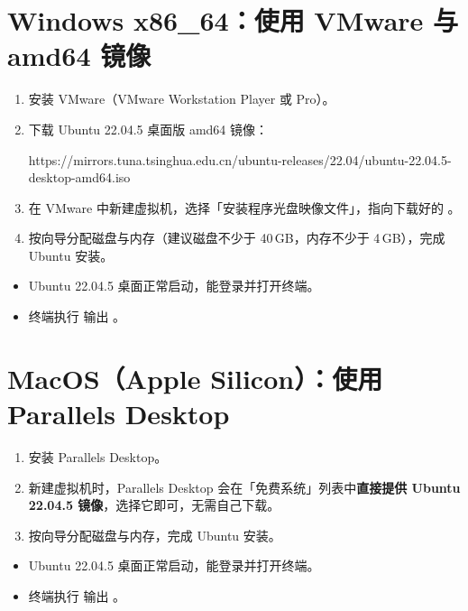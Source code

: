\section{Windows x86\_64：使用 VMware 与 amd64 镜像}
\label{sec:win-vmware}
\begin{enumerate}
\item 安装 VMware（VMware Workstation Player 或 Pro）。
\item 下载 Ubuntu 22.04.5 桌面版 amd64 镜像：
\begin{command}
https://mirrors.tuna.tsinghua.edu.cn/ubuntu-releases/22.04/ubuntu-22.04.5-desktop-amd64.iso
\end{command}
\item 在 VMware 中新建虚拟机，选择「安装程序光盘映像文件」，指向下载好的 。
\item 按向导分配磁盘与内存（建议磁盘不少于 40\,GB，内存不少于 4\,GB），完成 Ubuntu 安装。
\end{enumerate}

\begin{expected}
\begin{itemize}
\item Ubuntu 22.04.5 桌面正常启动，能登录并打开终端。
\item 终端执行  输出 。
\end{itemize}
\end{expected}

\section{MacOS（Apple Silicon）：使用 Parallels Desktop}
\label{sec:mac-parallels}
\begin{enumerate}
\item 安装 Parallels Desktop。
\item 新建虚拟机时，Parallels Desktop 会在「免费系统」列表中\textbf{直接提供 Ubuntu 22.04.5 镜像}，选择它即可，无需自己下载。
\item 按向导分配磁盘与内存，完成 Ubuntu 安装。
\end{enumerate}

\begin{expected}
\begin{itemize}
\item Ubuntu 22.04.5 桌面正常启动，能登录并打开终端。
\item 终端执行  输出 。
\end{itemize}
\end{expected}

